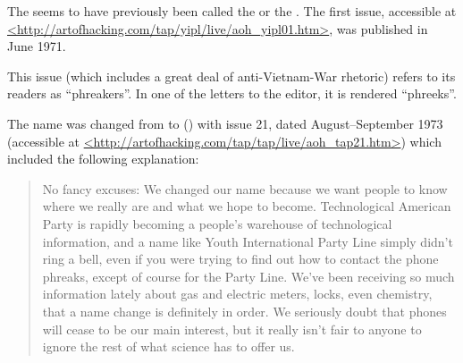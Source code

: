 \begin{new}
	The  seems to have previously been called the  or the
	. The first issue, accessible at
	\url{<http://artofhacking.com/tap/yipl/live/aoh_yipl01.htm>}, was published in June 1971.

	This issue (which includes a great deal of anti-Vietnam-War rhetoric) refers to its readers as ``phreakers''. In one of the letters to
	the editor, it is rendered ``phreeks''.

	The name was changed from  to  () with issue 21, dated
	August--September 1973 (accessible at \url{<http://artofhacking.com/tap/tap/live/aoh_tap21.htm>}) which included the following
	explanation:

	\begin{quote}
		No fancy excuses: We changed our name because we want people to know where we really are and what we hope to become. Technological
		American Party is rapidly becoming a people's warehouse of technological information, and a name like Youth International Party
		Line simply didn't ring a bell, even if you were trying to find out how to contact the phone phreaks, except of course for the
		Party Line. We've been receiving so much information lately about gas and electric meters, locks, even chemistry, that a name
		change is definitely in order. We seriously doubt that phones will cease to be our main interest, but it really isn't fair to
		anyone to ignore the rest of what science has to offer us.
	\end{quote}
\end{new}

